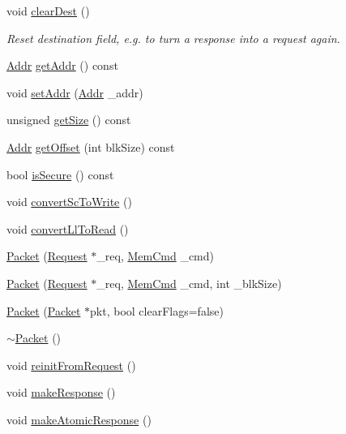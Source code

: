 \begin{DoxyCompactItemize}
void \hyperlink{classPacket_a2d986bc7c63bf7c63e392296d32f77ae}{clearDest} ()
\begin{DoxyCompactList}\small\item\em Reset destination field, e.g. to turn a response into a request again. \item\end{DoxyCompactList}\item 
\hyperlink{base_2types_8hh_af1bb03d6a4ee096394a6749f0a169232}{Addr} \hyperlink{classPacket_afca9af4d83a57836baba87603463a6e0}{getAddr} () const 
\item 
void \hyperlink{classPacket_ac449086ed3ddac64f5f55926907b6b0c}{setAddr} (\hyperlink{base_2types_8hh_af1bb03d6a4ee096394a6749f0a169232}{Addr} \_\-addr)
\item 
unsigned \hyperlink{classPacket_a1d18ba49c7be427da1f4a42d53e35f48}{getSize} () const 
\item 
\hyperlink{base_2types_8hh_af1bb03d6a4ee096394a6749f0a169232}{Addr} \hyperlink{classPacket_a8c497c6b3c41668562b2a2aa57ad098d}{getOffset} (int blkSize) const 
\item 
bool \hyperlink{classPacket_a3110ebf17828782ae5aeced7396cfff2}{isSecure} () const 
\item 
void \hyperlink{classPacket_ac4dec10b288f4bdc07dd66688b81f832}{convertScToWrite} ()
\item 
void \hyperlink{classPacket_a4d3d1abff83d841c66d318d026a5d58e}{convertLlToRead} ()
\item 
\hyperlink{classPacket_af96a2c11524631f891fcbd42cf919f53}{Packet} (\hyperlink{classRequest}{Request} $\ast$\_\-req, \hyperlink{classMemCmd}{MemCmd} \_\-cmd)
\item 
\hyperlink{classPacket_a14ed9efd5f1e1b89778e2dd02cb0d6ab}{Packet} (\hyperlink{classRequest}{Request} $\ast$\_\-req, \hyperlink{classMemCmd}{MemCmd} \_\-cmd, int \_\-blkSize)
\item 
\hyperlink{classPacket_a19cdd324c9f9070b3031e8a4521ac4ba}{Packet} (\hyperlink{classPacket}{Packet} $\ast$pkt, bool clearFlags=false)
\item 
\hyperlink{classPacket_a39d19f9b1d6f6c2028a930cdfcdff809}{$\sim$Packet} ()
\item 
void \hyperlink{classPacket_a03e8085580e8f97f3177195fe2ed27e7}{reinitFromRequest} ()
\item 
void \hyperlink{classPacket_a9330bf4cbbc7e25bbfc9626182df27e5}{makeResponse} ()
\item 
void \hyperlink{classPacket_ad664e704f09d6bb5c116573721034ebd}{makeAtomicResponse} ()

\end{DoxyCompactItemize}
